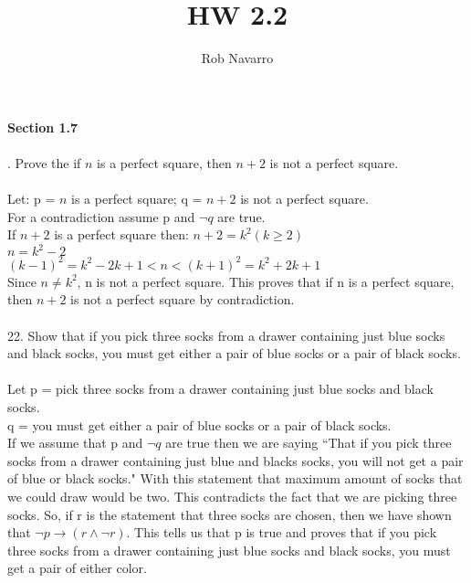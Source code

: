 \documentclass[11pt, oneside]{article}   	%
\title{HW 2.2}
\author{Rob Navarro}
\begin{document}
\maketitle
\noindent\textbf{Section 1.7}\\\\
. Prove the if $n$ is a perfect square, then $n + 2$ is not a perfect square.\\\\
Let: p = $n$ is a perfect square;   q = $n + 2$ is not a perfect square.\\
For a contradiction assume p and $\neg q$ are true. \\
If $n + 2$ is a perfect square then:
$n + 2 = k^2(k\geq 2)$\\
$n = k^2 - 2$\\
$(k - 1)^2 = k^2 - 2k + 1 < n < (k+1)^2 = k^2 + 2k + 1$\\
Since $n\neq k^2$, n is not a perfect square. This proves that if n is a perfect square, then $n +2$ is not a perfect square by contradiction. \\\\
22. Show that if you pick three socks from a drawer containing just blue socks and black socks, you must get either a pair of blue socks or a pair of black socks.\\\\
Let p = pick three socks from a drawer containing just blue socks and black socks.\\
q = you must get either a pair of blue socks or a pair of black socks.\\
If we assume that p and $\neg q$ are true then we are saying ``That if you pick three socks from a drawer containing just blue and blacks socks, you will not get a pair of blue or black socks." With this statement that maximum amount of socks that we could draw would be two. This contradicts the fact that we are picking three socks. So, if r is the statement that three socks are chosen, then we have shown that $\neg p\to (r\wedge\neg r)$. This tells us that p is true and proves that if you pick three socks from a drawer containing just blue socks and black socks, you must get a pair of either color. \\\\
\end{document}
